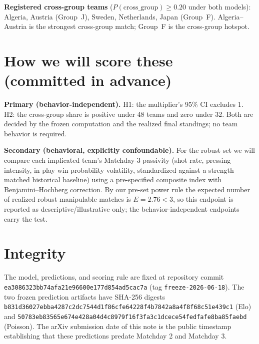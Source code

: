 \documentclass[11pt]{article}
\begin{document}
\noindent
\textbf{Registered cross-group teams} ($P(\text{cross\_group})\ge 0.20$ under both models): Algeria,
Austria (Group~J), Sweden, Netherlands, Japan (Group~F). Algeria--Austria is the strongest cross-group
match; Group~F is the cross-group hotspot.

\section{How we will score these (committed in advance)}
\textbf{Primary (behavior-independent).} H1: the multiplier's 95\% CI excludes $1$. H2: the cross-group
share is positive under 48 teams and zero under 32. Both are decided by the frozen computation and the
realized final standings; no team behavior is required.

\textbf{Secondary (behavioral, explicitly confoundable).} For the robust set we will compare each
implicated team's Matchday-3 passivity (shot rate, pressing intensity, in-play win-probability
volatility, standardized against a strength-matched historical baseline) using a pre-specified composite
index with Benjamini--Hochberg correction. By our pre-set power rule the expected number of realized
robust manipulable matches is $E=2.76<3$, so this endpoint is reported as descriptive/illustrative only;
the behavior-independent endpoints carry the test.

\section{Integrity}
The model, predictions, and scoring rule are fixed at repository commit
\texttt{ea3086323bb74afa21e96600e177d854ad5cac7a} (tag \texttt{freeze-2026-06-18}). The two frozen
prediction artifacts have SHA-256 digests
\texttt{b831d36027ebba4287c2dc7544d1f86cfe64228f4b7842a8a4f8f68c51e439c1} (Elo) and
\texttt{50783eb83565e674e428a04d4c8979f16f3fa3c1dcece54fedfafe8ba85faebd} (Poisson). The arXiv
submission date of this note is the public timestamp establishing that these predictions predate
Matchday 2 and Matchday 3.
\end{document}
